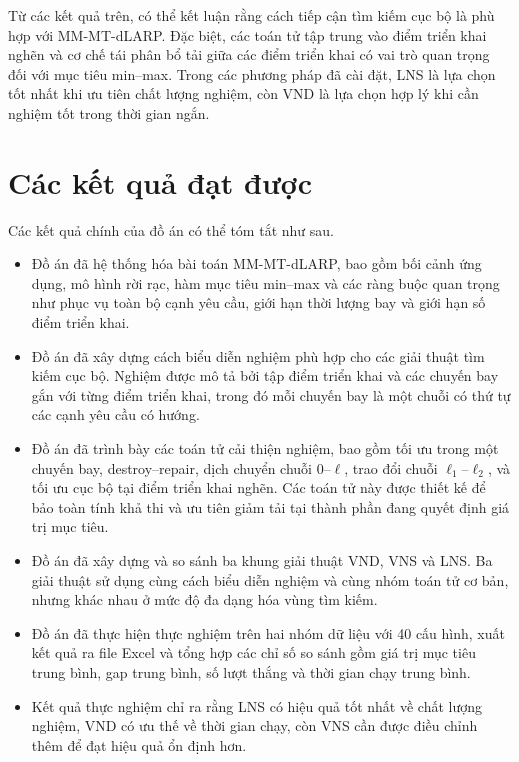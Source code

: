 Từ các kết quả trên, có thể kết luận rằng cách tiếp cận tìm kiếm cục bộ là phù hợp với MM-MT-dLARP. Đặc biệt, các toán tử tập trung vào điểm triển khai nghẽn và cơ chế tái phân bổ tải giữa các điểm triển khai có vai trò quan trọng đối với mục tiêu min--max. Trong các phương pháp đã cài đặt, LNS là lựa chọn tốt nhất khi ưu tiên chất lượng nghiệm, còn VND là lựa chọn hợp lý khi cần nghiệm tốt trong thời gian ngắn.

\section{Các kết quả đạt được}
\label{sec:conclusion-contributions}

Các kết quả chính của đồ án có thể tóm tắt như sau.

\begin{itemize}
    \item Đồ án đã hệ thống hóa bài toán MM-MT-dLARP, bao gồm bối cảnh ứng dụng, mô hình rời rạc, hàm mục tiêu min--max và các ràng buộc quan trọng như phục vụ toàn bộ cạnh yêu cầu, giới hạn thời lượng bay và giới hạn số điểm triển khai.

    \item Đồ án đã xây dựng cách biểu diễn nghiệm phù hợp cho các giải thuật tìm kiếm cục bộ. Nghiệm được mô tả bởi tập điểm triển khai và các chuyến bay gắn với từng điểm triển khai, trong đó mỗi chuyến bay là một chuỗi có thứ tự các cạnh yêu cầu có hướng.

    \item Đồ án đã trình bày các toán tử cải thiện nghiệm, bao gồm tối ưu trong một chuyến bay, destroy--repair, dịch chuyển chuỗi \(0\)--\(\ell\), trao đổi chuỗi \(\ell_1\)--\(\ell_2\), và tối ưu cục bộ tại điểm triển khai nghẽn. Các toán tử này được thiết kế để bảo toàn tính khả thi và ưu tiên giảm tải tại thành phần đang quyết định giá trị mục tiêu.

    \item Đồ án đã xây dựng và so sánh ba khung giải thuật VND, VNS và LNS. Ba giải thuật sử dụng cùng cách biểu diễn nghiệm và cùng nhóm toán tử cơ bản, nhưng khác nhau ở mức độ đa dạng hóa vùng tìm kiếm.

    \item Đồ án đã thực hiện thực nghiệm trên hai nhóm dữ liệu với 40 cấu hình, xuất kết quả ra file Excel và tổng hợp các chỉ số so sánh gồm giá trị mục tiêu trung bình, gap trung bình, số lượt thắng và thời gian chạy trung bình.

    \item Kết quả thực nghiệm chỉ ra rằng LNS có hiệu quả tốt nhất về chất lượng nghiệm, VND có ưu thế về thời gian chạy, còn VNS cần được điều chỉnh thêm để đạt hiệu quả ổn định hơn.
\end{itemize}

